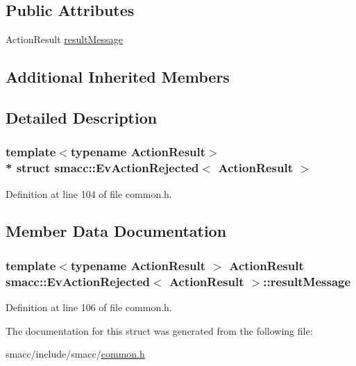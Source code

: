 \subsection*{Public Attributes}
\begin{DoxyCompactItemize}
\item 
Action\+Result \hyperlink{structsmacc_1_1EvActionRejected_a86e148e49f60cf8172d58bb12fe371c4}{result\+Message}
\end{DoxyCompactItemize}
\subsection*{Additional Inherited Members}


\subsection{Detailed Description}
\subsubsection*{template$<$typename Action\+Result$>$\\*
struct smacc\+::\+Ev\+Action\+Rejected$<$ Action\+Result $>$}



Definition at line 104 of file common.\+h.



\subsection{Member Data Documentation}
\subsubsection[{\texorpdfstring{result\+Message}{resultMessage}}]{\setlength{\rightskip}{0pt plus 5cm}template$<$typename Action\+Result $>$ Action\+Result {\bf smacc\+::\+Ev\+Action\+Rejected}$<$ Action\+Result $>$\+::result\+Message}\hypertarget{structsmacc_1_1EvActionRejected_a86e148e49f60cf8172d58bb12fe371c4}{}\label{structsmacc_1_1EvActionRejected_a86e148e49f60cf8172d58bb12fe371c4}


Definition at line 106 of file common.\+h.



The documentation for this struct was generated from the following file\+:\begin{DoxyCompactItemize}
\item 
smacc/include/smacc/\hyperlink{common_8h}{common.\+h}\end{DoxyCompactItemize}
